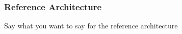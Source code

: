 \subsubsection{Reference Architecture}
\begin{flushleft}
Say what you want to say for the reference architecture

\end{flushleft}